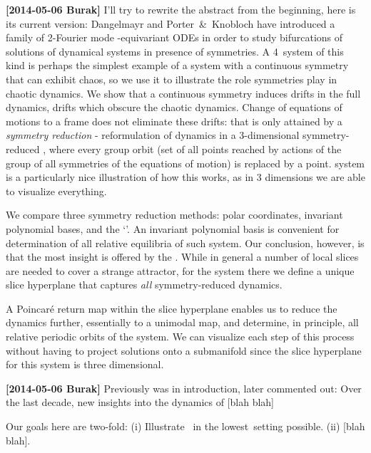 {\bf[2014-05-06 Burak]} I'll try to rewrite the abstract from the beginning,
here is its current version:
\newline
Dangelmayr and Porter~\&\ Knobloch have
introduced a family of 2-Fourier mode -equivariant ODEs  in order to
study bifurcations of solutions of dynamical systems in presence of
symmetries. A 4\dmn\ system of this kind is perhaps the simplest
example of a system with a continuous symmetry that can exhibit chaos, so
we use it to illustrate the role symmetries play in chaotic dynamics. We
show that a continuous symmetry induces drifts in the full
{\statesp} dynamics, drifts which obscure the chaotic dynamics. Change of
equations of motions to a {\comovframe} frame
does not eliminate these drifts: that is only attained by a
\emph{symmetry reduction} - reformulation of dynamics in a 3-dimensional
symmetry-reduced {\statesp}, where every group orbit (set of all points
reached by actions of the group of all symmetries of the equations of
motion) is replaced by a point. {\twoMode} system is a
particularly nice illustration of how this works, as in 3 dimensions we
are able to visualize everything.

We compare three symmetry reduction methods: polar coordinates, invariant
polynomial bases, and the `{\mslices}'. An invariant polynomial
basis is convenient for determination of all relative equilibria of such
system. Our conclusion, however, is that the most insight is offered by
the {\mslices}. While in general a number of local slices are
needed to cover a strange attractor, for the {\twomode}
system there we define a unique slice hyperplane that captures
\emph{all} symmetry-reduced dynamics. 

A Poincar\'e return map within the
slice hyperplane enables us to reduce the dynamics further, essentially
to a unimodal map, and determine, in principle, all relative periodic
orbits of the system. We can visualize each step of this process without
having to project solutions onto a submanifold since the slice hyperplane
for this system is three dimensional.

{\bf[2014-05-06 Burak]} Previously was in introduction, later commented
out:
\newline
Over the last decade, new insights into the dynamics of  [blah blah]

Our goals here are two-fold:
(i)  Illustrate \mslices\ in the lowest\dmn\ setting possible.
(ii) [blah blah].

